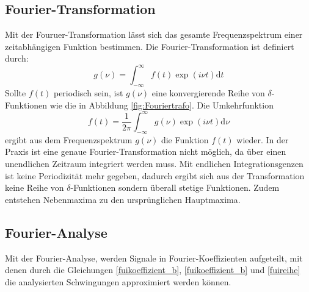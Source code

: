 \subsection{Fourier-Transformation}
\label{sec:Fourier-Transformation}
Mit der Fouruer-Transformation lässt sich das gesamte Frequenzspektrum einer
zeitabhängigen Funktion bestimmen. Die Fourier-Transformation ist definiert durch:
\begin{equation}
  g(\nu)= \int_{-\infty}^\infty f(t)\exp(i\nu t) \mathrm{d}t
\end{equation}
Sollte $f(t)$ periodisch sein, ist $g(\nu)$ eine konvergierende Reihe von
$\delta$-Funktionen wie die in Abbildung \ref{fig:Fouriertrafo}. Die Umkehrfunktion
\begin{equation}
  f(t)= \frac{1}{2\pi}\int_{-\infty}^\infty g(\nu)\exp(i\nu t) \mathrm{d}\nu
\end{equation}
ergibt aus dem Frequenzspektrum $g(\nu)$ die Funktion $f(t)$ wieder. In der
Praxis ist eine genaue Fourier-Transformation nicht möglich, da über einen unendlichen
Zeitraum integriert werden muss. Mit endlichen Integrationsgenzen ist keine
Periodizität mehr gegeben, dadurch ergibt sich aus der Transformation keine Reihe
von $\delta$-Funktionen sondern überall stetige Funktionen. Zudem entstehen
Nebenmaxima zu den ursprünglichen Hauptmaxima.
\subsection{Fourier-Analyse}
\label{sec:Fourier-Analyse}
Mit der Fourier-Analyse, werden Signale in Fourier-Koeffizienten aufgeteilt, mit
denen durch die Gleichungen \eqref{fuikoeffizient_b}, \eqref{fuikoeffizient_b}
und \eqref{fuireihe} die analysierten Schwingungen approximiert werden können.



\cite{sample}
